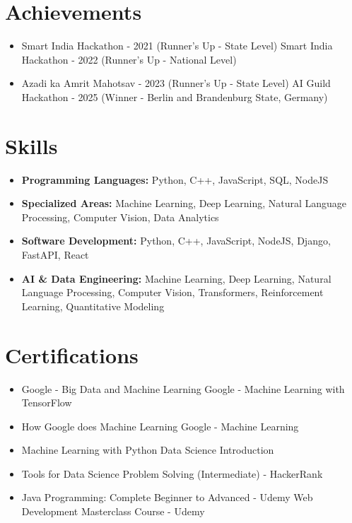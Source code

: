 \documentclass[a4paper,10pt]{article}
\begin{document}
\section*{Achievements}
\begin{itemize}
\item Smart India Hackathon - 2021 (Runner's Up - State Level) \hfill Smart India Hackathon - 2022 (Runner's Up - National Level)
\item Azadi ka Amrit Mahotsav - 2023 (Runner's Up - State Level) \hfill AI Guild Hackathon - 2025 (Winner - Berlin and Brandenburg State, Germany)
\end{itemize}

\section*{Skills}
\begin{itemize}
  \item \textbf{Programming Languages:} Python, C++, JavaScript, SQL, NodeJS
  \item \textbf{Specialized Areas:} Machine Learning, Deep Learning, Natural Language Processing, Computer Vision, Data Analytics
  \item \textbf{Software Development:} Python, C++, JavaScript, NodeJS, Django, FastAPI, React
  \item \textbf{AI \& Data Engineering:} Machine Learning, Deep Learning, Natural Language Processing, Computer Vision, Transformers, Reinforcement Learning, Quantitative Modeling
\end{itemize}

\section*{Certifications}
\begin{itemize}
\item Google - Big Data and Machine Learning \hfill Google - Machine Learning with TensorFlow
\item How Google does Machine Learning \hfill Google - Machine Learning
\item Machine Learning with Python \hfill Data Science Introduction
\item Tools for Data Science \hfill Problem Solving (Intermediate) - HackerRank
\item Java Programming: Complete Beginner to Advanced - Udemy \hfill Web Development Masterclass Course - Udemy
\end{itemize}
\end{document}
